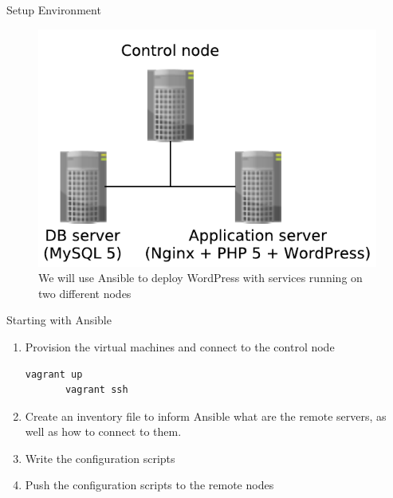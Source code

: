 \documentclass[xcolor=dvipsnames,slidestop, mathserif]{beamer}
\begin{document}
\begin{frame}{Setup Environment}
\vspace{-0.6cm}
  \begin{figure}
     \centering
     \includegraphics{environment-configuration}
     \caption{We will use Ansible to deploy WordPress with services running on two different nodes}
  \end{figure}
\end{frame}

\begin{frame}[fragile]{Starting with Ansible}
  \begin{enumerate}
    \item Provision the virtual machines and connect to the control node
    \begin{lstlisting}[language=Bash]
       vagrant up
       vagrant ssh
    \end{lstlisting}
    \item Create an inventory file to inform Ansible what are the remote servers, as well as how to connect to them.
    \item Write the configuration scripts
    \item Push the configuration scripts to the remote nodes
  \end{enumerate}
\end{frame}
\end{document}
